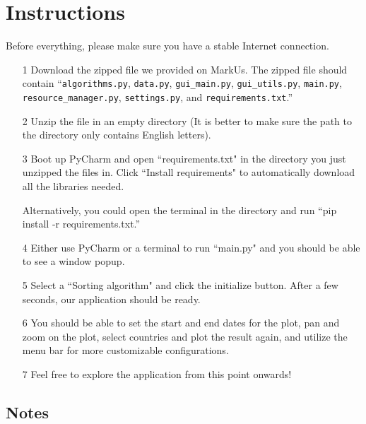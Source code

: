 \documentclass[fontsize=11pt]{article}
\begin{document}
    \newpage

    \section{Instructions}

    Before everything, please make sure you have a stable Internet connection.

    \begin{enumerate}
        \item [1]
            Download the zipped file we provided on MarkUs. The zipped file should contain ``\verb|algorithms.py|, \verb|data.py|, \verb|gui_main.py|, \verb|gui_utils.py|, \verb|main.py|, \verb|resource_manager.py|, \verb|settings.py|, and \verb|requirements.txt|.''

        \item [2]
            Unzip the file in an empty directory (It is better to make sure the path to the directory only contains English letters).
        \item [3]
            Boot up PyCharm and open ``requirements.txt" in the directory you just unzipped the files in. Click ``Install requirements" to automatically download all the libraries needed.

            Alternatively, you could open the terminal in the directory and run ``pip install -r requirements.txt.''

        \item [4]
            Either use PyCharm or a terminal to run ``main.py" and you should be able to see a window popup.

        \item [5]
            Select a ``Sorting algorithm" and click the initialize button. After a few seconds, our application should be ready.

        \item [6]
            You should be able to set the start and end dates for the plot, pan and zoom on the plot, select countries and plot the result again, and utilize the menu bar for more customizable configurations.

        \item [7]
            Feel free to explore the application from this point onwards!

    \end{enumerate}

    \subsection{Notes}
\end{document}
